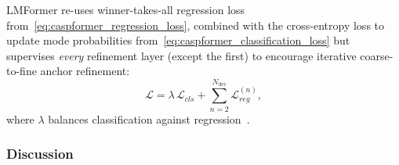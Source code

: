 LMFormer re-uses winner-takes-all regression loss from~\autoref{eq:caspformer_regression_loss}, combined with the cross-entropy loss to update mode probabilities from~\autoref{eq:caspformer_classification_loss} but supervises \emph{every} refinement layer (except the first) to encourage iterative coarse-to-fine anchor refinement:
\begin{equation}
  \mathcal{L}
  = \lambda\,\mathcal{L}_{cls}
    + \sum_{n=2}^{N_{\text{dec}}}\mathcal{L}_{reg}^{(n)},
  \label{eq:lm_loss}
\end{equation}
where \(\lambda\) balances classification against regression~\cite{lmformerYadav2025}.

\subsubsection*{Discussion} %

